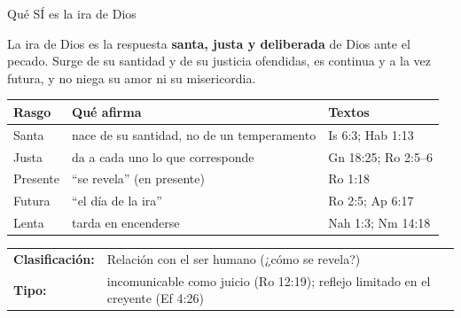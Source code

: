 \documentclass[hyperref={bookmarks=false},aspectratio=169]{beamer}
\newcommand{\destacar}[1]{\textbf{\textcolor{azul}{#1}}}
\begin{document}
\begin{frame}{Qué SÍ es la ira de Dios}
\begin{tcolorbox}[colback=papiro,colframe=azul,boxrule=1pt,arc=3pt,fonttitle=\bfseries\small,title=Definición]
\small La ira de Dios es la respuesta \destacar{santa, justa y deliberada} de Dios ante el pecado. Surge de su santidad y de su justicia ofendidas, es continua y a la vez futura, y no niega su amor ni su misericordia.
\end{tcolorbox}
\scriptsize\renewcommand{\arraystretch}{1.25}
\begin{tabular}{@{}>{\RaggedRight\arraybackslash}p{2.4cm}>{\RaggedRight\arraybackslash}p{5.6cm}>{\RaggedRight\arraybackslash}p{3.6cm}@{}}
\toprule
\textbf{Rasgo} & \textbf{Qué afirma} & \textbf{Textos} \\ \midrule
Santa & nace de su santidad, no de un temperamento & Is 6:3; Hab 1:13 \\
Justa & da a cada uno lo que corresponde & Gn 18:25; Ro 2:5--6 \\
Presente & ``se revela'' (en presente) & Ro 1:18 \\
Futura & ``el día de la ira'' & Ro 2:5; Ap 6:17 \\
Lenta & tarda en encenderse & Nah 1:3; Nm 14:18 \\
\bottomrule
\end{tabular}\par\smallskip
\begin{center}\footnotesize
\begin{tabular}{ll}
\textbf{Clasificación:} & Relación con el ser humano (¿cómo se revela?)\\
\textbf{Tipo:} & incomunicable como juicio (Ro 12:19); reflejo limitado en el creyente (Ef 4:26)\\
\end{tabular}
\end{center}
\end{frame}
\end{document}

